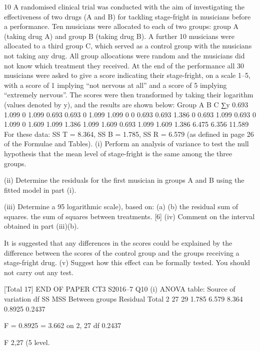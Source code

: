 \documentclass[a4paper,12pt]{article}
\begin{document}
\begin{enumerate}
[Total 21]10
A randomised clinical trial was conducted with the aim of investigating the
effectiveness of two drugs (A and B) for tackling stage-fright in musicians before a
performance. Ten musicians were allocated to each of two groups: group A (taking
drug A) and group B (taking drug B). A further 10 musicians were allocated to a third
group C, which served as a control group with the musicians not taking any drug. All
group allocations were random and the musicians did not know which treatment they
received.
At the end of the performance all 30 musicians were asked to give a score indicating
their stage-fright, on a scale 1–5, with a score of 1 implying “not nervous at all” and a
score of 5 implying “extremely nervous”. The scores were then transformed by
taking their logarithm (values denoted by y), and the results are shown below:
Group
A
B
C
∑y
0.693 1.099
0
1.099 0.693 0.693
0
1.099 1.099
0
0
0.693 0.693 1.386
0
0.693 1.099 0.693
0
1.099
0
1.609 1.099 1.386 1.099 1.609 0.693 1.099 1.609 1.386
6.475
6.356
11.589
For these data: SS T = 8.364, SS B = 1.785, SS R = 6.579 (as defined in page 26 of the
Formulae and Tables).
(i) Perform an analysis of variance to test the null hypothesis that the mean level
of stage-fright is the same among the three groups.

(ii) Determine the residuals for the first musician in groups A and B using the
fitted model in part (i).

(iii) Determine a 95%
logarithmic scale), based on:
(a)
(b)
the residual sum of squares.
the sum of squares between treatments.
[6]
(iv)
Comment on the interval obtained in part (iii)(b).

It is suggested that any differences in the scores could be explained by the difference
between the scores of the control group and the groups receiving a stage-fright drug.
(v)
Suggest how this effect can be formally tested. You should not carry out any
test.

[Total 17]
END OF PAPER
CT3 S2016–7
Q10
(i)
ANOVA table:
Source of variation df SS MSS
Between groups
Residual
Total 2
27
29 1.785
6.579
8.364 0.8925
0.2437

F =
0.8925
= 3.662 on 2, 27 df
0.2437

F 2,27 (5%
level.


\end{enumerate}
\end{document}
